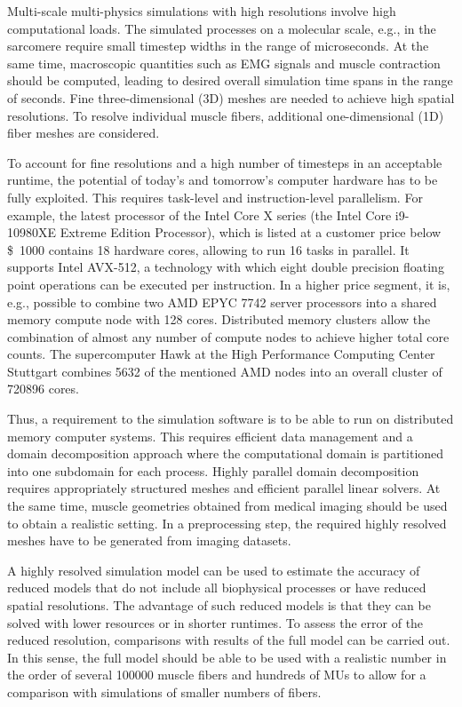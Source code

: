 Multi-scale multi-physics simulations with high resolutions involve high computational loads. The simulated processes on a molecular scale, e.g., in the sarcomere require small timestep widths in the range of microseconds. At the same time, macroscopic quantities such as EMG signals and muscle contraction should be computed, leading to desired overall simulation time spans in the range of seconds.
Fine three-dimensional (3D) meshes are needed to achieve high spatial resolutions. To resolve individual muscle fibers, additional one-dimensional (1D) fiber meshes are considered.

To account for fine resolutions and a high number of timesteps in an acceptable runtime, the potential of today's and tomorrow's computer hardware has to be fully exploited. This requires task-level and instruction-level parallelism. For example, the latest processor of the Intel Core X series (the Intel Core i9-10980XE Extreme Edition Processor), which is listed at a customer price below \SI{1000}[\$]{} contains 18 hardware cores, allowing to run 16 tasks in parallel. It supports Intel AVX-512, a technology with which eight double precision floating point operations can be executed per instruction. 
In a higher price segment, it is, e.g., possible to combine two AMD EPYC 7742 server processors into a shared memory compute node with \num{128} cores. Distributed memory clusters allow the combination of almost any number of compute nodes to achieve higher total core counts. The supercomputer Hawk at the High Performance Computing Center Stuttgart combines \num{5632} of the mentioned AMD nodes into an overall cluster of \num{720896} cores.

Thus, a requirement to the simulation software is to be able to run on distributed memory computer systems. This requires efficient data management and a domain decomposition approach where the computational domain is partitioned into one subdomain for each process.
Highly parallel domain decomposition requires appropriately structured meshes and efficient parallel linear solvers. At the same time, muscle geometries obtained from medical imaging should be used to obtain a realistic setting. In a preprocessing step, the required highly resolved meshes have to be generated from imaging datasets.

A highly resolved simulation model can be used to estimate the accuracy of reduced models that do not include all biophysical processes or have reduced spatial resolutions. The advantage of such reduced models is that they can be solved with lower resources or in shorter runtimes. To assess the error of the reduced resolution, comparisons with results of the full model can be carried out. In this sense, the full model should be able to be used with a realistic number in the order of several \num{100000} muscle fibers and hundreds of MUs to allow for a comparison with simulations of smaller numbers of fibers.

